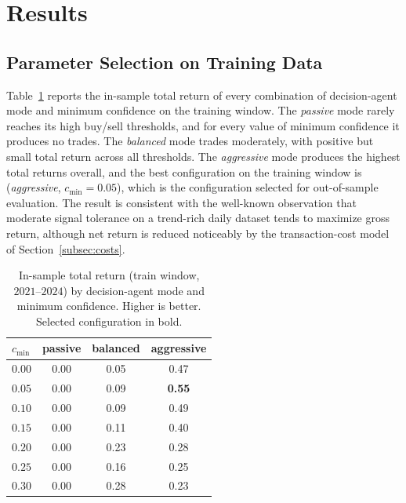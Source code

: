 \documentclass{ieeeaccess}
\newcommand{\BestMinConf}{\ensuremath{0.05}}
\begin{document}
\section{Results}
\label{sec:results}

\subsection{Parameter Selection on Training Data}

Table~\ref{tab:grid_train} reports the in-sample total return of every combination of decision-agent mode and minimum confidence on the training window. The \emph{passive} mode rarely reaches its high buy/sell thresholds, and for every value of minimum confidence it produces no trades. The \emph{balanced} mode trades moderately, with positive but small total return across all thresholds. The \emph{aggressive} mode produces the highest total returns overall, and the best configuration on the training window is (\emph{aggressive}, $c_{\min} = \BestMinConf{}$), which is the configuration selected for out-of-sample evaluation. The result is consistent with the well-known observation that moderate signal tolerance on a trend-rich daily dataset tends to maximize gross return, although net return is reduced noticeably by the transaction-cost model of Section~\ref{subsec:costs}.

\begin{table}[t]
\centering
\caption{In-sample total return (train window, $2021$--$2024$) by decision-agent mode and minimum confidence. Higher is better. Selected configuration in bold.}
\label{tab:grid_train}
\begin{tabular}{lccc}
\toprule
$c_{\min}$ & passive & balanced & aggressive \\
\midrule
$0.00$ & 0.00 & 0.05 & 0.47 \\
$0.05$ & 0.00 & 0.09 & \textbf{0.55} \\
$0.10$ & 0.00 & 0.09 & 0.49 \\
$0.15$ & 0.00 & 0.11 & 0.40 \\
$0.20$ & 0.00 & 0.23 & 0.28 \\
$0.25$ & 0.00 & 0.16 & 0.25 \\
$0.30$ & 0.00 & 0.28 & 0.23 \\
\bottomrule
\end{tabular}
\end{table}
\end{document}
